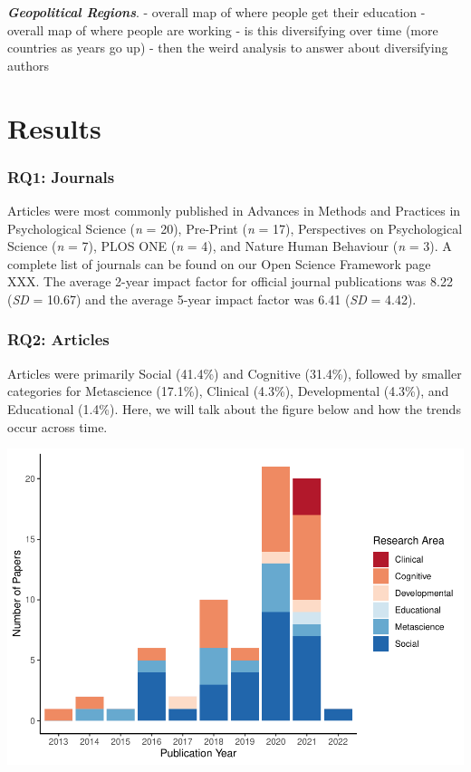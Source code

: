 \documentclass[
  english,
  man]{apa6}
\begin{document}
\textbf{\emph{Geopolitical Regions}}.
- overall map of where people get their education
- overall map of where people are working
- is this diversifying over time (more countries as years go up)
- then the weird analysis to answer about diversifying authors

\hypertarget{results}{%
\section{Results}\label{results}}

\hypertarget{rq1-journals-1}{%
\subsubsection{RQ1: Journals}\label{rq1-journals-1}}

Articles were most commonly published in Advances in Methods and Practices in Psychological Science (\emph{n} = 20), Pre-Print (\emph{n} = 17), Perspectives on Psychological Science (\emph{n} = 7), PLOS ONE (\emph{n} = 4), and Nature Human Behaviour (\emph{n} = 3). A complete list of journals can be found on our Open Science Framework page XXX. The average 2-year impact factor for official journal publications was 8.22 (\emph{SD} = 10.67) and the average 5-year impact factor was 6.41 (\emph{SD} = 4.42).

\hypertarget{rq2-articles-1}{%
\subsubsection{RQ2: Articles}\label{rq2-articles-1}}

Articles were primarily Social (41.4\%) and Cognitive (31.4\%), followed by smaller categories for Metascience (17.1\%), Clinical (4.3\%), Developmental (4.3\%), and Educational (1.4\%). Here, we will talk about the figure below and how the trends occur across time.

\includegraphics{04.manuscript_files/figure-latex/figure1-1.pdf}
\end{document}
